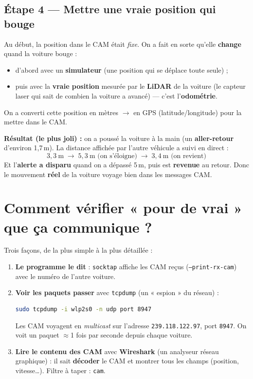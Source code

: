 \documentclass[a4paper,11pt]{article}
\begin{document}
\subsection{Étape 4 --- Mettre une vraie position qui bouge}
Au début, la position dans le CAM était \emph{fixe}. On a fait en sorte qu'elle
\textbf{change} quand la voiture bouge :
\begin{itemize}[leftmargin=1.4em, nosep]
  \item d'abord avec un \textbf{simulateur} (une position qui se déplace toute seule) ;
  \item puis avec la \textbf{vraie position} mesurée par le \textbf{LiDAR} de la
        voiture (le capteur laser qui sait de combien la voiture a avancé) ---
        c'est l'\textbf{odométrie}.
\end{itemize}
On a converti cette position en mètres $\rightarrow$ en GPS (latitude/longitude)
pour la mettre dans le CAM.

\textbf{Résultat (le plus joli) :} on a poussé la voiture à la main (un
\textbf{aller-retour} d'environ 1,7\,m). La distance affichée par l'autre véhicule
a suivi en direct :
\[
3{,}3\ \text{m} \;\rightarrow\; 5{,}3\ \text{m (on s'éloigne)} \;\rightarrow\; 3{,}4\ \text{m (on revient)}
\]
Et l'\textbf{alerte a disparu} quand on a dépassé 5\,m, puis est \textbf{revenue}
au retour. Donc le mouvement \textbf{réel} de la voiture voyage bien dans les
messages CAM.

\section{Comment vérifier « pour de vrai » que ça communique ?}
Trois façons, de la plus simple à la plus détaillée :
\begin{enumerate}[leftmargin=1.6em]
  \item \textbf{Le programme le dit} : \texttt{socktap} affiche les CAM reçus
        (\texttt{--print-rx-cam}) avec le numéro de l'autre voiture.
  \item \textbf{Voir les paquets passer} avec \texttt{tcpdump} (un « espion »
        du réseau) :
\begin{lstlisting}[language=bash]
sudo tcpdump -i wlp2s0 -n udp port 8947
\end{lstlisting}
        Les CAM voyagent en \emph{multicast} sur l'adresse \texttt{239.118.122.97},
        port \texttt{8947}. On voit un paquet $\approx$1 fois par seconde depuis
        chaque voiture.
  \item \textbf{Lire le contenu des CAM} avec \textbf{Wireshark} (un analyseur
        réseau graphique) : il sait \textbf{décoder} le CAM et montrer tous les
        champs (position, vitesse\ldots). Filtre à taper : \texttt{cam}.
\end{enumerate}
\end{document}
